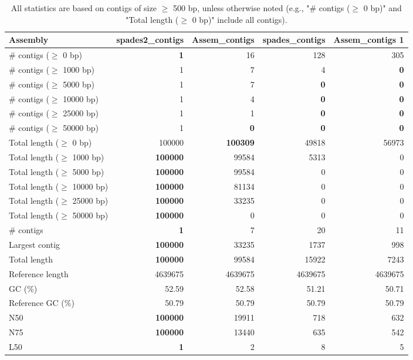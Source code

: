 \documentclass[12pt,a4paper]{article}
\begin{document}
\begin{table}[ht]
\begin{center}
\caption{All statistics are based on contigs of size $\geq$ 500 bp, unless otherwise noted (e.g., "\# contigs ($\geq$ 0 bp)" and "Total length ($\geq$ 0 bp)" include all contigs).}
\begin{tabular}{|l*{4}{|r}|}
\hline
Assembly & spades2\_contigs & Assem\_contigs & spades\_contigs & Assem\_contigs 1 \\ \hline
\# contigs ($\geq$ 0 bp) & {\bf 1} & 16 & 128 & 305 \\ \hline
\# contigs ($\geq$ 1000 bp) & 1 & 7 & 4 & {\bf 0} \\ \hline
\# contigs ($\geq$ 5000 bp) & 1 & 7 & {\bf 0} & {\bf 0} \\ \hline
\# contigs ($\geq$ 10000 bp) & 1 & 4 & {\bf 0} & {\bf 0} \\ \hline
\# contigs ($\geq$ 25000 bp) & 1 & 1 & {\bf 0} & {\bf 0} \\ \hline
\# contigs ($\geq$ 50000 bp) & 1 & {\bf 0} & {\bf 0} & {\bf 0} \\ \hline
Total length ($\geq$ 0 bp) & 100000 & {\bf 100309} & 49818 & 56973 \\ \hline
Total length ($\geq$ 1000 bp) & {\bf 100000} & 99584 & 5313 & 0 \\ \hline
Total length ($\geq$ 5000 bp) & {\bf 100000} & 99584 & 0 & 0 \\ \hline
Total length ($\geq$ 10000 bp) & {\bf 100000} & 81134 & 0 & 0 \\ \hline
Total length ($\geq$ 25000 bp) & {\bf 100000} & 33235 & 0 & 0 \\ \hline
Total length ($\geq$ 50000 bp) & {\bf 100000} & 0 & 0 & 0 \\ \hline
\# contigs & {\bf 1} & 7 & 20 & 11 \\ \hline
Largest contig & {\bf 100000} & 33235 & 1737 & 998 \\ \hline
Total length & {\bf 100000} & 99584 & 15922 & 7243 \\ \hline
Reference length & 4639675 & 4639675 & 4639675 & 4639675 \\ \hline
GC (\%) & 52.59 & 52.58 & 51.21 & 50.71 \\ \hline
Reference GC (\%) & 50.79 & 50.79 & 50.79 & 50.79 \\ \hline
N50 & {\bf 100000} & 19911 & 718 & 632 \\ \hline
N75 & {\bf 100000} & 13440 & 635 & 542 \\ \hline
L50 & {\bf 1} & 2 & 8 & 5 \\ \hline

\end{tabular}
\end{center}
\end{table}
\end{document}
